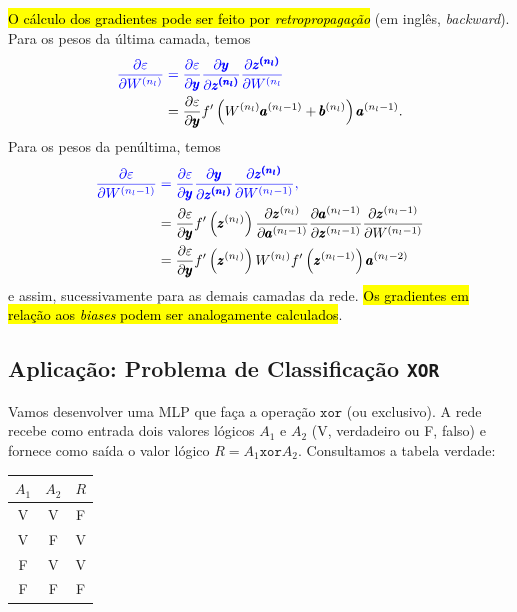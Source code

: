 \hl{O cálculo dos gradientes pode ser feito por \emph{retropropagação}} (em inglês, \textit{backward}). Para os pesos da última camada, temos
\begin{align}
  \color{blue}\frac{\partial\varepsilon}{\partial W^{(n_l)}} &\color{blue}= \frac{\partial\varepsilon}{\partial\pmb{y}}\frac{\partial\pmb{y}}{\partial\pmb{z^{(n_l)}}}\frac{\partial\pmb{z^{(n_l)}}}{\partial W^{(n_l}}  \\
                             &= \frac{\partial\varepsilon}{\partial\pmb{y}}f'\left(W^{(n_l)}\pmb{a}^{(n_l-1)}+\pmb{b}^{(n_l)}\right)\pmb{a}^{(n_l-1)}.
\end{align}
Para os pesos da penúltima, temos
\begin{align}
  \color{blue}\frac{\partial\varepsilon}{\partial W^{(n_l-1)}} &\color{blue}= \frac{\partial\varepsilon}{\partial\pmb{y}}\frac{\partial\pmb{y}}{\partial\pmb{z^{(n_l)}}}\frac{\partial\pmb{z^{(n_l)}}}{\partial W^{(n_l-1)}},\\
                                     &= \frac{\partial\varepsilon}{\partial\pmb{y}}f'\left(\pmb{z}^{(n_l)}\right)\frac{\partial\pmb{z}^{(n_l)}}{\partial\pmb{a}^{(n_l-1)}}\frac{\partial\pmb{a}^{(n_l-1)}}{\partial\pmb{z}^{(n_l-1)}}\frac{\partial\pmb{z}^{(n_l-1)}}{\partial W^{(n_l-1)}}\\
                                     &= \frac{\partial\varepsilon}{\partial\pmb{y}}f'\left(\pmb{z}^{(n_l)}\right)W^{(n_l)}f'\left(\pmb{z}^{(n_l-1)}\right)\pmb{a}^{(n_l-2)}
\end{align}
e assim, sucessivamente para as demais camadas da rede. \hl{Os gradientes em relação aos \textit{biases} podem ser analogamente calculados}.

\subsection{Aplicação: Problema de Classificação \texttt{XOR}}

Vamos desenvolver uma MLP que faça a operação $\texttt{xor}$ (ou exclusivo). A rede recebe como entrada dois valores lógicos $A_1$ e $A_2$ (V, verdadeiro ou F, falso) e fornece como saída o valor lógico $R = A_1 \texttt{xor} A_2$. Consultamos a tabela verdade:

\begin{center}
  \begin{tabular}{cc|c}
    $A_1$ & $A_2$ & $R$\\\hline
    V & V & F\\
    V & F & V\\
    F & V & V\\
    F & F & F\\\hline
  \end{tabular}
\end{center}

